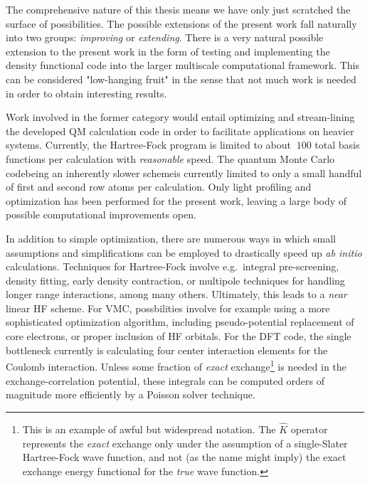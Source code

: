 \documentclass[twoside,english]{uiofysmaster}
\begin{document}
The comprehensive nature of this thesis means we have only just scratched the surface of possibilities. The possible extensions of the present work fall naturally into two groups: \emph{improving} or \emph{extending}. There is a very natural possible extension to the present work in the form of testing and implementing the density functional code into the larger multiscale computational framework. This can be considered "low-hanging fruit" in the sense that not much work is needed in order to obtain interesting results. 

Work involved in the former category would entail optimizing and stream-lining the developed QM calculation code in order to facilitate applications on heavier systems. Currently, the Hartree-Fock program is limited to about $~100$ total basis functions per calculation with \emph{reasonable} speed. The quantum Monte Carlo code\textemdash being an inherently slower scheme\textemdash is currently limited to only a small handful of first and second row atoms per calculation. Only light profiling and optimization has been performed for the present work, leaving a large body of possible computational improvements open. 

In addition to simple optimization, there are numerous ways in which small assumptions and simplifications can be employed to drastically speed up \emph{ab initio} calculations. Techniques for Hartree-Fock involve e.g.\ integral pre-screening, density fitting, early density contraction, or multipole techniques for handling longer range interactions, among many others. Ultimately, this leads to a \emph{near} linear HF scheme. For VMC, possbilities involve for example using a more sophisticated optimization algorithm, including pseudo-potential replacement of core electrons, or proper inclusion of HF orbitals. For the DFT code, the single bottleneck currently is calculating four center interaction elements for the Coulomb interaction. Unless some fraction of \emph{exact} exchange\footnote{This is an example of awful but widespread notation. The $\hat K$ operator represents the \emph{exact} exchange only under the assumption of a single-Slater Hartree-Fock wave function, and not (as the name might imply) the exact exchange energy functional for the \emph{true} wave function.} is needed in the exchange-correlation potential, these integrals can be computed orders of magnitude more efficiently by a Poisson solver technique. 
\end{document}

